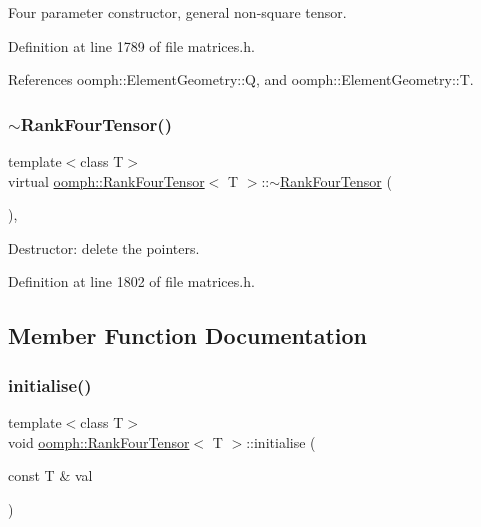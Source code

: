Four parameter constructor, general non-\/square tensor. 



Definition at line 1789 of file matrices.\+h.



References oomph\+::\+Element\+Geometry\+::Q, and oomph\+::\+Element\+Geometry\+::T.

\mbox{\label{classoomph_1_1RankFourTensor_a4165ed9adc8b0c0702a3a6d883cd9844}} 
\subsubsection{\texorpdfstring{$\sim$\+Rank\+Four\+Tensor()}{~RankFourTensor()}}
{\footnotesize\ttfamily template$<$class T$>$ \\
virtual \hyperlink{classoomph_1_1RankFourTensor}{oomph\+::\+Rank\+Four\+Tensor}$<$ T $>$\+::$\sim$\hyperlink{classoomph_1_1RankFourTensor}{Rank\+Four\+Tensor} (\begin{DoxyParamCaption}{ }\end{DoxyParamCaption})\hspace{0.3cm}{\ttfamily [inline]}, {\ttfamily [virtual]}}



Destructor\+: delete the pointers. 



Definition at line 1802 of file matrices.\+h.



\subsection{Member Function Documentation}
\mbox{\label{classoomph_1_1RankFourTensor_ae75018549ea237c4608b41ecc62eef65}} 
\subsubsection{\texorpdfstring{initialise()}{initialise()}}
{\footnotesize\ttfamily template$<$class T$>$ \\
void \hyperlink{classoomph_1_1RankFourTensor}{oomph\+::\+Rank\+Four\+Tensor}$<$ T $>$\+::initialise (\begin{DoxyParamCaption}\item[{const T \&}]{val }\end{DoxyParamCaption})\hspace{0.3cm}{\ttfamily [inline]}}



